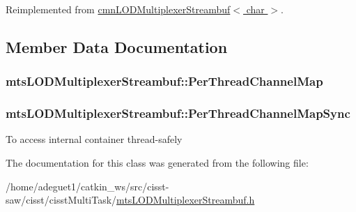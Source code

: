 Reimplemented from \hyperlink{classcmn_l_o_d_multiplexer_streambuf_a143dfb4f86ab7f7b5e29bde48fae4bba}{cmn\-L\-O\-D\-Multiplexer\-Streambuf$<$ char $>$}.



\subsection{Member Data Documentation}
\hypertarget{classmts_l_o_d_multiplexer_streambuf_af30117fcef2a05140848f7ca2678d87b}{
\subsubsection[{Per\-Thread\-Channel\-Map}]{ mts\-L\-O\-D\-Multiplexer\-Streambuf\-::\-Per\-Thread\-Channel\-Map\hspace{0.3cm}{\ttfamily [protected]}}}\label{classmts_l_o_d_multiplexer_streambuf_af30117fcef2a05140848f7ca2678d87b}
\hypertarget{classmts_l_o_d_multiplexer_streambuf_a9a3e813b12e3041f208b89134af18cd5}{
\subsubsection[{Per\-Thread\-Channel\-Map\-Sync}]{ mts\-L\-O\-D\-Multiplexer\-Streambuf\-::\-Per\-Thread\-Channel\-Map\-Sync\hspace{0.3cm}{\ttfamily [protected]}}}\label{classmts_l_o_d_multiplexer_streambuf_a9a3e813b12e3041f208b89134af18cd5}
To access internal container thread-\/safely 

The documentation for this class was generated from the following file\-:\begin{DoxyCompactItemize}
\item 
/home/adeguet1/catkin\-\_\-ws/src/cisst-\/saw/cisst/cisst\-Multi\-Task/\hyperlink{mts_l_o_d_multiplexer_streambuf_8h}{mts\-L\-O\-D\-Multiplexer\-Streambuf.\-h}\end{DoxyCompactItemize}
